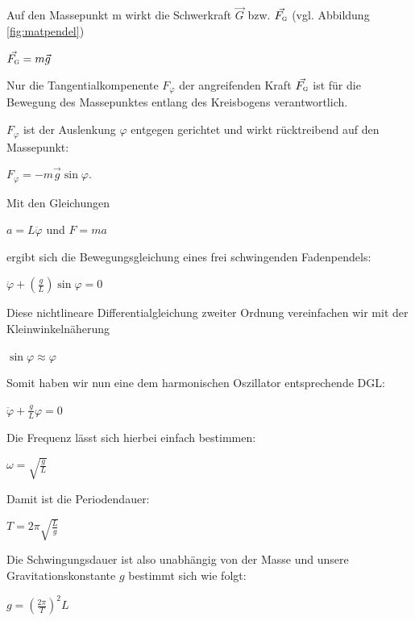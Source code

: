 \documentclass[11pt,a4paper,titlepage, ngerman]{article}
\begin{document}
			\setlength{\parindent}{0em}
				Auf den Massepunkt m wirkt die Schwerkraft $ \vec{G}$ bzw. $ \vec{F_\textsc{g}}$ (vgl. Abbildung \ref{fig:matpendel}) \\
			
			\begin{center}
				{ $ \vec{F_\textsc{g}} = m\vec{g}$} 
			\end{center}
			
			Nur die Tangentialkompenente $F_\varphi$ der angreifenden Kraft $ \vec{F_\textsc{g}}$ ist für die Bewegung des Massepunktes entlang des Kreisbogens verantwortlich.   	
			  
			$F_\varphi$ ist der Auslenkung $\varphi$ entgegen gerichtet und wirkt  rücktreibend auf den Massepunkt:
			
			\begin{center}  
				$F_\varphi = - m\vec{g} \sin\varphi.$ 
			\end{center}
			
			Mit den Gleichungen 
			\begin{center}
				$a = L \ddot{\varphi}$ und $F = ma$ 
			\end{center}
		
			ergibt sich die Bewegungsgleichung eines frei schwingenden Fadenpendels: 
			\begin{center}
				$\ddot{\varphi}+\left( \frac{g}{L}\right)  \sin \varphi = 0$	
			\end{center}
			
			Diese nichtlineare Differentialgleichung zweiter Ordnung vereinfachen wir mit der Kleinwinkelnäherung
			\begin{center}
				$\sin \varphi \approx \varphi $	
			\end{center} 
			
			Somit haben wir nun eine dem harmonischen Oszillator entsprechende DGL:
			\begin{center}
				$\ddot{\varphi}+\frac{g}{L} \varphi = 0$	
			\end{center}
			
			Die Frequenz lässt sich hierbei einfach bestimmen: 
			\begin{center}
				$\omega =  \sqrt{\frac{g}{L}}$
			\end{center}
			
			Damit ist die Periodendauer:
			\begin{center}
				$T =  2\pi \sqrt{\frac{L}{g}}$
			\end{center} 
		
			Die Schwingungsdauer ist also unabhängig von der Masse und unsere Gravitationskonstante $g$ bestimmt sich wie folgt:
			\begin{center}
				$g = (\frac{2 \pi}{T})^2 L$
			\end{center} 
		
\end{document}
